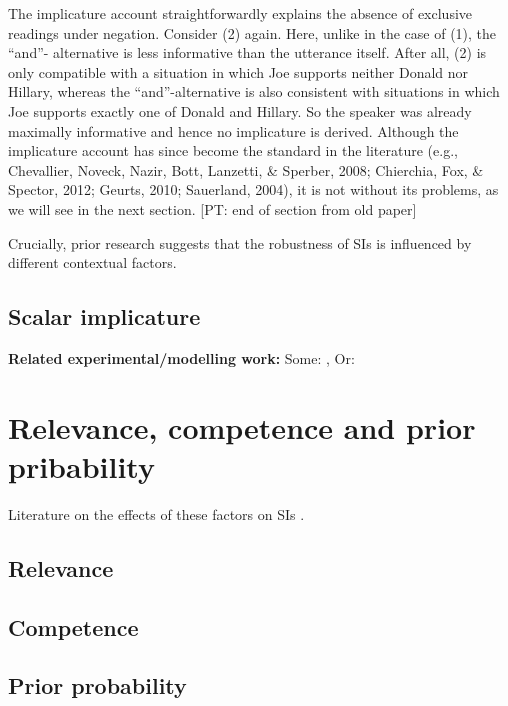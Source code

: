 \documentclass{sp}
\newcommand{\pt}[1]{\textcolor{Cerulean}{[PT: #1]}}
\begin{document}
The implicature account straightforwardly explains the absence of exclusive readings
under negation. Consider (2) again. Here, unlike in the case of (1), the “and”-
alternative is less informative than the utterance itself. After all, (2) is only compatible
with a situation in which Joe supports neither Donald nor Hillary, whereas the
“and”-alternative is also consistent with situations in which Joe supports exactly one
of Donald and Hillary. So the speaker was already maximally informative and hence
no implicature is derived.
Although the implicature account has since become the standard in the literature
(e.g., Chevallier, Noveck, Nazir, Bott, Lanzetti, \& Sperber, 2008; Chierchia, Fox, \&
Spector, 2012; Geurts, 2010; Sauerland, 2004), it is not without its problems, as we
will see in the next section. 
\pt{end of section from old paper}

Crucially, prior research suggests that the robustness of SIs is influenced by different contextual factors.

\subsection{Scalar implicature}

\textbf{Related experimental/modelling work: } 
Some: \citep{degen2015investigating, goodman2016pragmatic}, 
Or: \citep{Li2021}

\section{Relevance, competence and prior pribability}
Literature on the effects of these factors on SIs \citep{sperber1986relevance, goodman2013knowledge, degen2015wonky}. 
\subsection{Relevance}

\subsection{Competence}

\subsection{Prior probability}
\end{document}
